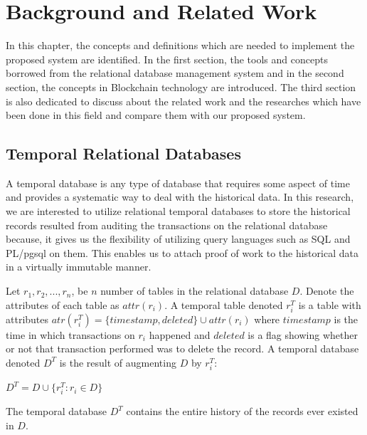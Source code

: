 \chapter{Background and Related Work} \label{ch:background}
	In this chapter, the concepts and definitions which are needed to implement the proposed system are identified. In the first section, the tools and concepts borrowed from the relational database management system and in the second section, the concepts in Blockchain technology are introduced. The third section is also dedicated to discuss about the related work and the researches which have been done in this field and compare them with our proposed system.

	\section{Temporal Relational Databases} \label{sec:temporal database}
		 A temporal database is any type of database that requires some aspect of time \cite {elmasri2010fundamentalsofdatabase} and provides a systematic way to deal with the historical data. In this research, we are interested to utilize relational temporal databases to store the historical records resulted from auditing the transactions on the relational database because, it gives us the flexibility of utilizing query languages such as SQL and PL/pgsql on them. This enables us to attach proof of work to the historical data in a virtually immutable manner.

		\begin{defn}
			Let $r_1, r_2, ... , r_n$, be $n$ number of tables in the relational database $D$. Denote the attributes of each table as $attr(r_i)$. A temporal table denoted $r_i^T$ is a table with attributes $atr(r_i^T) = \{timestamp, deleted\}\cup attr(r_i)$ where $timestamp$ is the time in which transactions on $r_i$ happened and $deleted$ is a flag showing whether or not that transaction performed was to delete the record. A temporal database denoted $D^T$ is the result of augmenting $D$ by $r_i^T$:

			\begin{center}
				{$D^T = D \cup \{{r_i^T}: r_i \in D \}$}
			\end{center}
		\label{dfn:temporal_database}
		\end {defn}

		The temporal database $D^T$ contains the entire history of the records ever existed in $D$.


